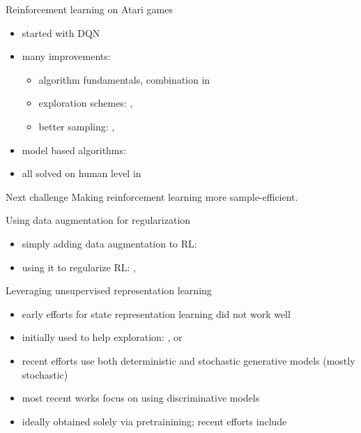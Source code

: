 \documentclass{beamer}
\begin{document}
\begin{frame}{Reinforcement learning on Atari games}
		\begin{itemize}
				\item started with DQN \cite{mnih2013atari}
				\item many improvements:
				\begin{itemize}
						\item algorithm fundamentals, combination in \cite{rainbow}
						\item exploration schemes: \cite{icm}, \cite{ecoffet2021first}
						\item better sampling: \cite{andrychowicz2017hindsight},
								\cite{kapturowski2018recurrent}
				\end{itemize}
		\item model based algorithms: \cite{schrittwieser2020mastering}
				\item all solved on human level in \cite{agent57}
		\end{itemize}

	\pause %
	\begin{alertblock}{Next challenge}
		Making reinforcement learning \alert{more sample-efficient}.
	\end{alertblock}
		
\end{frame}

\begin{frame}{Using data augmentation for regularization}
	\begin{itemize}
			\item simply adding data augmentation to RL: \cite{rad}
			\item using it to regularize RL: \cite{drqv1}, \cite{drqv2}
	\end{itemize}	
\end{frame}


\begin{frame}{Leveraging unsupervised representation learning}
	\begin{itemize}
			\item early efforts for state representation learning did not work well
			\item initially used to help exploration:
\cite{lossisitsownreward}, \cite{rlwauxloss} or \cite{icm}
\item recent efforts use both deterministic and stochastic generative models (mostly
		stochastic)
\item most recent works focus on using discriminative models 
\item ideally obtained solely via pretrainining; recent efforts include 
		\cite{seo2022reinforcement}
	\end{itemize}	
\end{frame}
\end{document}
